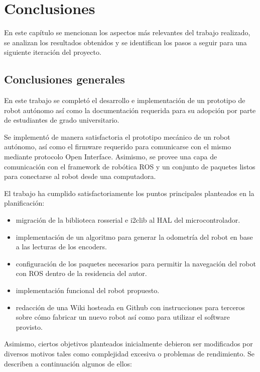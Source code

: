 
\chapter{Conclusiones}

\label{Capitulo5}

En este capítulo se mencionan los aspectos más relevantes del trabajo realizado, se analizan los resultados obtenidos y se identifican los pasos a seguir para una siguiente iteración del proyecto.

\section{Conclusiones generales}

En este trabajo se completó el desarrollo e implementación de un prototipo de robot autónomo así como la documentación requerida para su adopción por parte de estudiantes de grado universitario.

Se implementó de manera satisfactoria el prototipo mecánico de un robot autónomo, así como el firmware requerido para comunicarse con el mismo mediante protocolo Open Interface. Asimismo, se provee una capa de comunicación con el framework de robótica ROS y un conjunto de paquetes listos para conectarse al robot desde una computadora.

El trabajo ha cumplido satisfactoriamente los puntos principales planteados en la planificación:

\begin{itemize}
    \item migración de la biblioteca rosserial e i2clib al HAL del microcontrolador.
    \item implementación de un algoritmo para generar la odometría del robot en base a las lecturas de los encoders.
    \item configuración de los paquetes necesarios para permitir la navegación del robot con ROS dentro de la residencia del autor.
    \item implementación funcional del robot propuesto.
    \item redacción de una Wiki hosteada en Github con instrucciones para terceros sobre cómo fabricar un nuevo robot así como para utilizar el software provisto.
\end{itemize}

Asimismo, ciertos objetivos planteados inicialmente debieron ser modificados por diversos motivos tales como complejidad excesiva o problemas de rendimiento. Se describen a continuación algunos de ellos:

